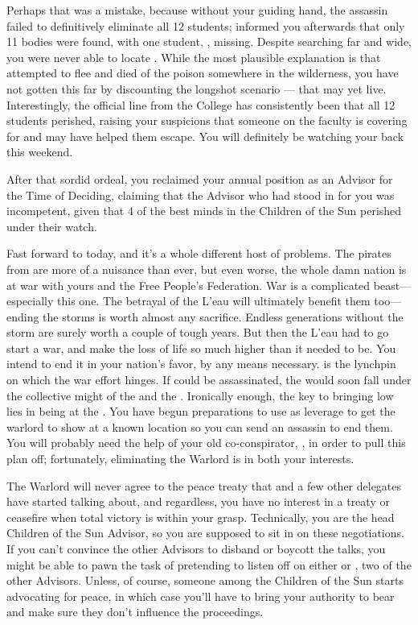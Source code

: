 \documentclass[char]{GL2020}
\begin{document}
Perhaps that was a mistake, because without your guiding hand, the assassin failed to definitively eliminate all 12 students; \cDiplomat{} informed you afterwards that only 11 bodies were found, with one student, \cKidScientist{\full}, missing. Despite searching far and wide, you were never able to locate \cKidScientist{\them}. While the most plausible explanation is that  attempted to flee and died of the poison somewhere in the wilderness, you have not gotten this far by discounting the longshot scenario — that \cKidScientist{} may yet live. Interestingly, the official line from the College has consistently been that all 12 students perished, raising your suspicions that someone on the faculty is covering for \cKidScientist{} and may have helped them escape. You will definitely be watching your back this weekend. 

After that sordid ordeal, you reclaimed your annual position as an Advisor for the Time of Deciding, claiming that the Advisor who had stood in for you was incompetent, given that 4 of the best minds in the Children of the Sun perished under their watch.

Fast forward to today, and it's a whole different host of problems. The pirates from \pShip{} are more of a nuisance than ever, but even worse, the whole damn nation is at war with yours and the Free People's Federation. War is a complicated beast---especially this one. The betrayal of the L'eau will ultimately benefit them too---ending the storms is worth almost any sacrifice. Endless generations without the storm are surely worth a couple of tough years. But then the L'eau had to go start a war, and make the loss of life so much higher than it needed to be. You intend to end it in your nation's favor, by any means necessary. \cLoud{\full} is the lynchpin on which the \pShip{} war effort hinges. If \cLoud{\they} could be assassinated, the \pShip{} would soon fall under the collective might of the \pFarm{} and the \pTech{}. Ironically enough, the key to bringing \cLoud{} low lies in \cLoud{\their} \cWarlordDaughter{\child} being at the \pSchool{}. You have begun preparations to use \cWarlordDaughter{\them} as leverage to get the warlord to show \cLoud{\themself} at a known location so you can send an assassin to end them. You will probably need the help of your old co-conspirator, \cDiplomat{}, in order to pull this plan off; fortunately, eliminating the Warlord is in both your interests.

The Warlord will never agree to the peace treaty that \cHeadDiplomat{} and a few other delegates have started talking about, and regardless, you have no interest in a treaty or ceasefire when total victory is within your grasp. Technically, you are the head Children of the Sun Advisor, so you are supposed to sit in on these negotiations. If you can't convince the other Advisors to disband or boycott the talks, you might be able to pawn the task of pretending to listen off on either \cWildCard{\full} or \cHedonist{\full}, two of the other Advisors. Unless, of course, someone among the Children of the Sun starts advocating for peace, in which case you'll have to bring your authority to bear and make sure they don't influence the proceedings.
\end{document}
